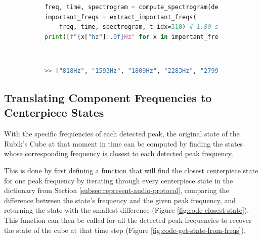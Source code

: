 \begin{figure}[h]
\caption{Example peak frequency decoding at a specific time step}
\label{fig:code-extract-important-freqs-demo}
\begin{subfigure}{\textwidth}
\begin{lstlisting}[language=Python]
freq, time, spectrogram = compute_spectrogram(demo_wav_path)
important_freqs = extract_important_freqs(
    freq, time, spectrogram, t_idx=310) # 1.80 seconds
print([f"{x["hz"]:.0f}Hz" for x in important_freqs])
\end{lstlisting}
\end{subfigure}\\

\begin{subfigure}{\textwidth}
\begin{lstlisting}[language=Python, numbers=none]
>> ["818Hz", "1593Hz", "1809Hz", "2283Hz", "2799Hz", "3316Hz"]
\end{lstlisting}
\end{subfigure}
\end{figure}

\subsection{Translating Component Frequencies to Centerpiece States}
\label{subsec:translating-freqs-to-state}
With the specific frequencies of each detected peak, the original state of the Rubik's Cube at that moment in time can be computed by finding the states whose corresponding frequency is closest to each detected peak frequency.

This is done by first defining a function that will find the closest centerpiece state for one peak frequency by iterating through every centerpiece state in the  dictionary from Section \ref{subsec:represent-audio-protocol}, comparing the difference between the state's frequency and the given peak frequency, and returning the state with the smallest difference (Figure \ref{fig:code-closest-state}).
This function can then be called for all the detected peak frequencies to recover the state of the cube at that time step (Figure \ref{fig:code-get-state-from-freqs}).

